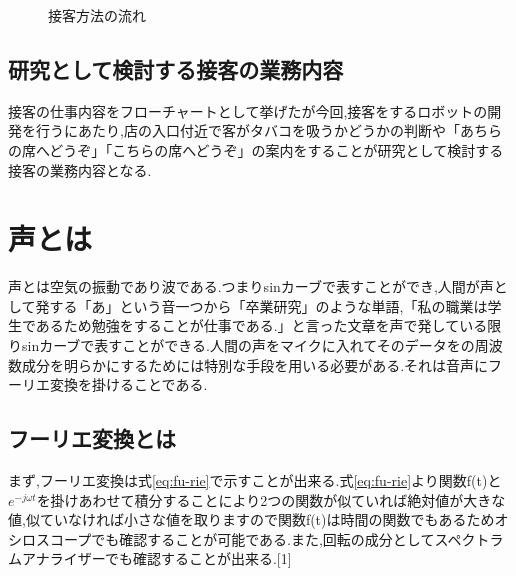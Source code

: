 \documentclass[12pt,oneside]{sotsuken_paper}
\begin{document}
\begin{figure}[htbp]
\scriptsize
{}
%
\caption{接客方法の流れ}
\label{fig:customer-service}%
\normalsize
\end{figure}


\subsection{研究として検討する接客の業務内容}
接客の仕事内容をフローチャートとして挙げたが今回,接客をするロボットの開発を行うにあたり,店の入口付近で客がタバコを吸うかどうかの判断や「あちらの席へどうぞ」「こちらの席へどうぞ」の案内をすることが研究として検討する接客の業務内容となる.


\section{声とは}
声とは空気の振動であり波である.つまりsinカーブで表すことができ,人間が声として発する「あ」という音一つから「卒業研究」のような単語,「私の職業は学生であるため勉強をすることが仕事である.」と言った文章を声で発している限りsinカーブで表すことができる.人間の声をマイクに入れてそのデータをの周波数成分を明らかにするためには特別な手段を用いる必要がある.それは音声にフーリエ変換を掛けることである.


\subsection{フーリエ変換とは}
まず,フーリエ変換は式\ref{eq:fu-rie}で示すことが出来る.式\ref{eq:fu-rie}より関数f(t)と$e^{-jωt}$を掛けあわせて積分することにより2つの関数が似ていれば絶対値が大きな値,似ていなければ小さな値を取りますので関数f(t)は時間の関数でもあるためオシロスコープでも確認することが可能である.また,回転の成分としてスペクトラムアナライザーでも確認することが出来る.[1]
\end{document}
